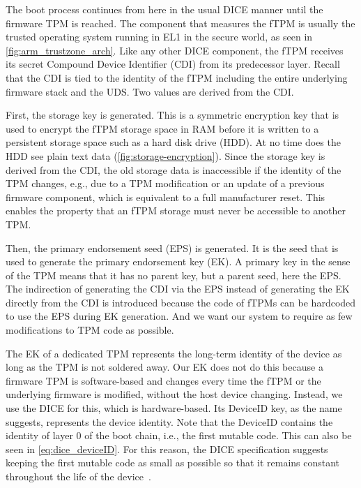 The boot process continues from here in the usual DICE manner until the firmware TPM is reached.
The component that measures the fTPM is usually the trusted operating system running in EL1 in the secure world, as seen in \autoref{fig:arm_trustzone_arch}.
Like any other DICE component, the fTPM receives its secret Compound Device Identifier (CDI) from its predecessor layer.
Recall that the CDI is tied to the identity of the fTPM including the entire underlying firmware stack and the UDS\@.
Two values are derived from the CDI\@.


First, the storage key is generated.
This is a symmetric encryption key that is used to encrypt the fTPM storage space in RAM before it is written to a persistent storage space such as a hard disk drive (HDD).
At no time does the HDD see plain text data (\autoref{fig:storage-encryption}).
Since the storage key is derived from the CDI, the old storage data is inaccessible if the identity of the TPM changes, e.g., due to a TPM modification or an update of a previous firmware component, which is equivalent to a full manufacturer reset.
This enables the property that an fTPM storage must never be accessible to another TPM\@.




Then, the primary endorsement seed (EPS) is generated.
It is the seed that is used to generate the primary endorsement key (EK).
A primary key in the sense of the TPM means that it has no parent key, but a parent seed, here the EPS\@.
The indirection of generating the CDI via the EPS instead of generating the EK directly from the CDI is introduced because the code of fTPMs can be hardcoded to use the EPS during EK generation.
And we want our system to require as few modifications to TPM code as possible.


The EK of a dedicated TPM represents the long-term identity of the device as long as the TPM is not soldered away.
Our EK does not do this because a firmware TPM is software-based and changes every time the fTPM or the underlying firmware is modified, without the host device changing.
Instead, we use the DICE for this, which is hardware-based.
Its DeviceID key, as the name suggests, represents the device identity.
Note that the DeviceID contains the identity of layer 0 of the boot chain, i.e., the first mutable code.
This can also be seen in \autoref{eq:dice_deviceID}.
For this reason, the DICE specification suggests keeping the first mutable code as small as possible so that it remains constant throughout the life of the device~\cite{dice-layering-arch}.

